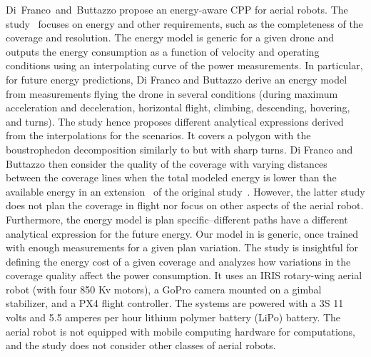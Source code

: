 Di~Franco~and~Buttazzo propose an energy-aware CPP for aerial robots. The study~\citep{difranco2015energy} focuses on energy and other requirements, such as the completeness of the coverage and resolution. The energy model is generic for a given drone and outputs the energy consumption as a function of velocity and operating conditions using an interpolating curve of the power measurements. In particular, for future energy predictions, Di Franco and Buttazzo derive an energy model from measurements flying the drone in several conditions (during maximum acceleration and deceleration, horizontal flight, climbing, descending, hovering, and turns). The study hence proposes different analytical expressions derived from the interpolations for the scenarios. It covers a polygon with the boustrophedon decomposition similarly to  but with sharp turns. Di Franco and Buttazzo then consider the quality of the coverage with varying distances between the coverage lines when the total modeled energy is lower than the available energy in an extension~\citep{difranco2016coverage} of the original study~\citep{difranco2015energy}. However, the latter study does not plan the coverage in flight nor focus on other aspects of the aerial robot. Furthermore, the energy model is plan specific--different paths have a different analytical expression for the future energy. Our model in  is generic, once trained with enough measurements for a given plan variation. The study is insightful for defining the energy cost of a given coverage and analyzes how variations in the coverage quality affect the power consumption. It uses an IRIS rotary-wing aerial robot (with four 850 Kv motors), a GoPro camera mounted on a gimbal stabilizer, and a PX4 flight controller. The systems are powered with a 3S 11 volts and 5.5 amperes per hour lithium polymer battery (LiPo) battery. The aerial robot is not equipped with mobile computing hardware for computations, and the study does not consider other classes of aerial robots.

